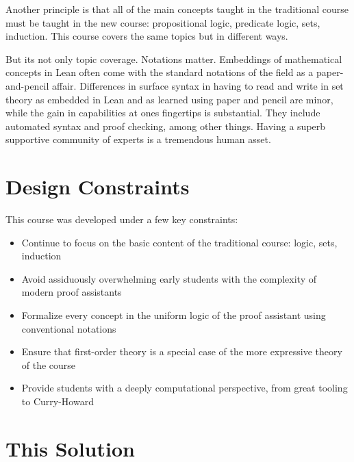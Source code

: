 \documentclass{book}
\providecommand{\tightlist}{%
  \setlength{\itemsep}{0pt}\setlength{\parskip}{0pt}}
\begin{document}
Another principle is that all of the main concepts taught in the traditional course must
be taught in the new course: propositional logic, predicate logic, sets, induction. This
course covers the same topics but in different ways.

But it\textquotesingle s not only topic coverage. Notations matter. Embeddings of mathematical concepts
in Lean often come with the standard notations of the field as a paper-and-pencil affair.
Differences in surface syntax in having to read and write in set theory as embedded in
Lean and as learned using paper and pencil are minor, while the gain in capabilities at
one\textquotesingle s fingertips is substantial. They include automated syntax and proof checking, among
other things. Having a superb supportive community of experts is a tremendous human asset.

\hypertarget{pandoc.profile.debug__pandoc__debug__src__preface.md__design-constraints}{%
\section*{Design Constraints}\label{pandoc.profile.debug__pandoc__debug__src__preface.md__design-constraints}}

This course was developed under a few key constraints:

\begin{itemize}
\tightlist
\item
  Continue to focus on the basic content of the traditional course: logic, sets, induction
\item
  Avoid assiduously overwhelming early students with the complexity of modern proof assistants
\item
  Formalize every concept in the uniform logic of the proof assistant using conventional notations
\item
  Ensure that first-order theory is a special case of the more expressive theory of the course
\item
  Provide students with a deeply computational perspective, from great tooling to Curry-Howard
\end{itemize}

\hypertarget{pandoc.profile.debug__pandoc__debug__src__preface.md__this-solution}{%
\section*{This Solution}\label{pandoc.profile.debug__pandoc__debug__src__preface.md__this-solution}}
\end{document}
